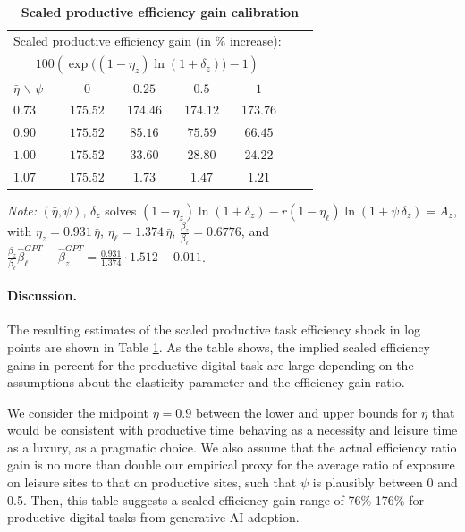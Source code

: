 \documentclass[12pt]{article}
\begin{document}
\begin{table}[!ht]
\centering \setlength{\tabcolsep}{24pt}
\caption{\\ \textbf{Scaled productive efficiency gain calibration}}
\label{tab:scaled_efficiency_gain_grid}
\begin{threeparttable}
\begin{tabular}{lcccccc}
\hline
\multicolumn{5}{c}{{Scaled productive efficiency gain (in \% increase):} } \\
 \multicolumn{5}{c}{$100\left(\exp\!\big((1-\eta_z)\ln(1+\delta_z)\big)-1\right)$} \\
\hline
$\bar{\eta}$ $\backslash$ $\psi$ & $0$ & $0.25$ & $0.5$ & $1$ \\
\hline
$0.73$ & $175.52$ & $174.46$ & $174.12$ & $173.76$ \\
$0.90$ & $175.52$ & $85.16$  & $75.59$  & $66.45$  \\
$1.00$ & $175.52$ & $33.60$  & $28.80$  & $24.22$  \\
$1.07$ & $175.52$ & $1.73$   & $1.47$   & $1.21$   \\
\hline
\end{tabular}


\begin{tablenotes}
            \item \footnotesize \emph{Note:}  $(\bar{\eta},\psi)$, $\delta_z$ solves
$(1-\eta_z)\ln(1+\delta_z)-r(1-\eta_\ell)\ln(1+\psi\,\delta_z)=A_z$, 
 with $\eta_z=0.931\,\bar{\eta}$, $\eta_\ell=1.374\,\bar{\eta}$, $\frac{\beta_z}{\beta_\ell}=0.6776$, and
$\frac{\beta_z} {\beta_{\ell}}\hat{\beta}^{GPT}_\ell - \hat{\beta}^{GPT}_z =\frac{0.931}{1.374}\cdot 1.512-0.011$. 
\end{tablenotes}
\end{threeparttable}
\end{table}






\paragraph{Discussion.} The resulting estimates of the scaled productive task efficiency shock in log points are shown in Table \ref{tab:scaled_efficiency_gain_grid}. As the table shows, the implied scaled efficiency gains in percent for the productive digital task are large  depending on the assumptions about the elasticity parameter and the efficiency gain ratio. 

We consider the midpoint $\bar{\eta} = 0.9$ between the lower and upper bounds for $\bar{\eta}$ that would be consistent with productive time  behaving as a necessity and leisure time as a luxury, as a pragmatic choice. We also assume that the actual efficiency ratio gain is no more than double our empirical proxy for the average ratio of exposure on leisure sites to that on productive sites, such that $\psi$ is plausibly between 0 and 0.5. Then, this table suggests a scaled efficiency gain range of 76\%-176\% for productive digital tasks from generative AI adoption.
\end{document}
